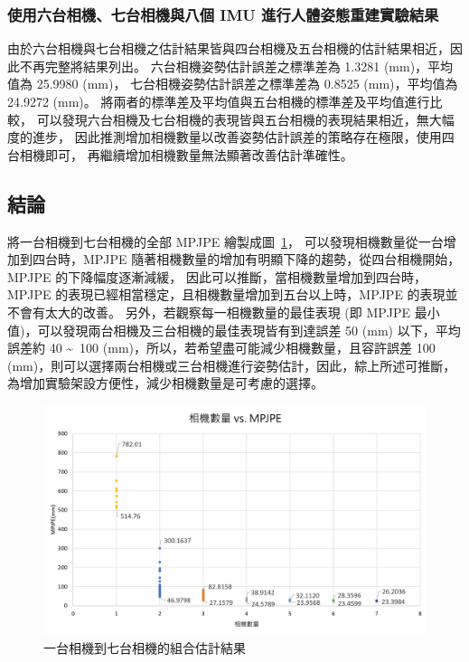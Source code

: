 \subsubsection{使用六台相機、七台相機與八個 IMU 進行人體姿態重建實驗結果}
由於六台相機與七台相機之估計結果皆與四台相機及五台相機的估計結果相近，因此不再完整將結果列出。
六台相機姿勢估計誤差之標準差為 1.3281 (mm)，平均值為 25.9980 (mm)，
七台相機姿勢估計誤差之標準差為 0.8525 (mm)，平均值為 24.9272 (mm)。
將兩者的標準差及平均值與五台相機的標準差及平均值進行比較，
可以發現六台相機及七台相機的表現皆與五台相機的表現結果相近，無大幅度的進步，
因此推測增加相機數量以改善姿勢估計誤差的策略存在極限，使用四台相機即可，
再繼續增加相機數量無法顯著改善估計準確性。

\subsection{結論}
將一台相機到七台相機的全部 MPJPE 繪製成圖~\ref{ch3_fig_1to7cam}，
可以發現相機數量從一台增加到四台時，MPJPE 隨著相機數量的增加有明顯下降的趨勢，從四台相機開始，MPJPE 的下降幅度逐漸減緩，
因此可以推斷，當相機數量增加到四台時，MPJPE 的表現已經相當穩定，且相機數量增加到五台以上時，MPJPE 的表現並不會有太大的改善。
另外，若觀察每一相機數量的最佳表現 (即 MPJPE 最小值)，可以發現兩台相機及三台相機的最佳表現皆有到達誤差 50 (mm) 以下，平均誤差約 40 \textasciitilde\ 100 (mm)，所以，若希望盡可能減少相機數量，且容許誤差 100 (mm)，則可以選擇兩台相機或三台相機進行姿勢估計，因此，綜上所述可推斷，為增加實驗架設方便性，減少相機數量是可考慮的選擇。
\begin{figure}[!ht]
   \centering
   \includegraphics[width=\linewidth]{figure/ch3_fig_1to7cam.png}
   \caption[一台相機到七台相機的組合估計結果]{一台相機到七台相機的組合估計結果}
   \label{ch3_fig_1to7cam}
\end{figure}

